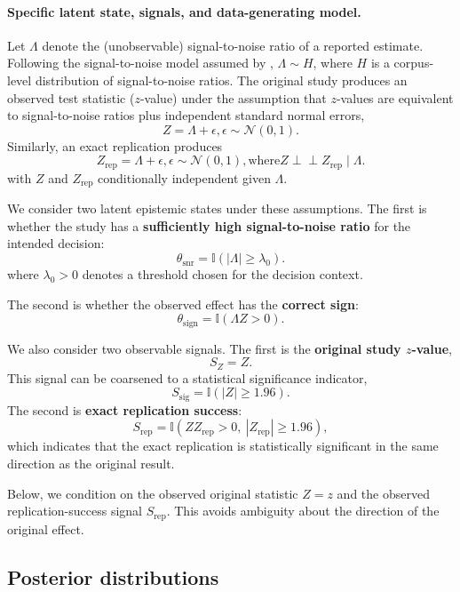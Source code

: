 \paragraph{Specific latent state, signals, and data-generating model.}
Let $\Lambda$ denote the (unobservable) signal-to-noise ratio of a reported estimate. Following the signal-to-noise model assumed by \citep{vanzwet2026}, %
$\Lambda \sim H$, 
where \(H\) is a corpus-level distribution of signal-to-noise ratios. The original study produces an observed test statistic ($z$-value) under the assumption that $z$-values are equivalent to signal-to-noise ratios plus independent standard normal errors,
\[
Z  = \Lambda + \epsilon, \epsilon \sim \mathcal{N}(0,1).
\]
Similarly, an exact replication produces
\[
Z_{\text{rep}} = \Lambda + \epsilon, \epsilon \sim \mathcal{N}(0,1), \text{where} Z \perp \! \! \! \perp Z_{\text{rep}} \mid \Lambda.
\]
with \(Z\) and \(Z_{\mathrm{rep}}\) conditionally independent given \(\Lambda\).

We consider two latent epistemic states under these assumptions. The first is whether the study has a \textbf{sufficiently high signal-to-noise ratio} for the intended decision: 
\[
\theta_{\mathrm{snr}}
=
\mathbb{I}(|\Lambda|\geq \lambda_0).
\]
where $\lambda_0>0$ denotes a threshold chosen for the decision context.


The second is whether the observed effect has the \textbf{correct sign}:
\[
\theta_{\mathrm{sign}}
=
\mathbb{I}(\Lambda Z>0).
\]


We also consider two observable signals. The first is the \textbf{original study $z$-value},
\[
S_Z = Z.
\]
This signal can be coarsened to a statistical significance indicator,
\[
S_{\mathrm{sig}}=\mathbb{I}(|Z|\geq 1.96).
\]
The second is \textbf{exact replication success}:
\[
S_{\mathrm{rep}}
=
\mathbb{I}(ZZ_{\mathrm{rep}}>0,\ |Z_{\mathrm{rep}}|\geq 1.96),
\]
which indicates that the exact replication is statistically significant in the same direction as the original result.

Below, we condition on the observed original statistic \(Z=z\) and the observed replication-success signal \(S_{\mathrm{rep}}\). This avoids ambiguity about the direction of the original effect.

\subsection{Posterior distributions}
